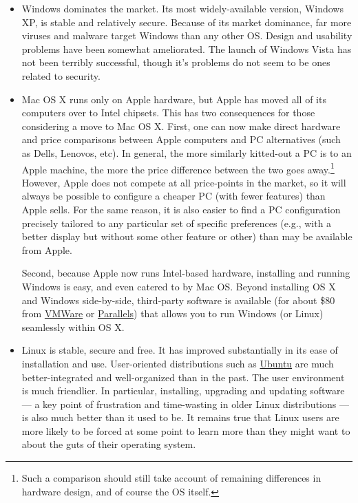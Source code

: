 \documentclass[11pt,article]{memoir}
\begin{document}
\begin{itemize}
	\item Windows dominates the market. Its most widely-available version, Windows XP, is stable and relatively secure. Because of its market dominance, far more viruses and malware target Windows than any other OS. Design and usability problems have been somewhat ameliorated. The launch of Windows Vista has not been terribly successful, though it's problems do not seem to be ones related to security.

	\item Mac OS X runs only on Apple hardware, but Apple has moved all of its computers over to Intel chipsets. This has two consequences for those considering a move to Mac OS X. First, one can now make direct hardware and price comparisons between Apple computers and PC alternatives (such as Dells, Lenovos, etc). In general, the more similarly kitted-out a PC is to an Apple machine, the more the price difference between the two goes away.\footnote{Such a comparison should still take account of remaining differences in hardware design, and of course the OS itself.} However, Apple does not compete at all price-points in the market, so it will always be possible to configure a cheaper PC (with fewer features) than Apple sells. For the same reason, it is also easier to find a PC configuration precisely tailored to any particular set of specific preferences (e.g., with a better display but without some other feature or other) than may be available from Apple. 
	
	Second, because Apple now runs Intel-based hardware, installing and running Windows is easy, and even catered to by Mac OS. Beyond installing OS X and Windows side-by-side, third-party software is available (for about \$80 from \href{http://www.vmware.com/products/fusion/}{VMWare} or \href{http://www.parallels.com/}{Parallels}) that allows you to run Windows (or Linux) seamlessly within OS X. 
	\item Linux is stable, secure and free. It has improved substantially in its ease of installation and use. User-oriented distributions such as \href{http://www.ubuntu.com/}{Ubuntu} are much better-integrated and well-organized than in the past. The user environment is much friendlier. In particular, installing, upgrading and updating software --- a key point of frustration and time-wasting in older Linux distributions --- is also much better than it used to be. It remains true that Linux users are more likely to be forced at some point to learn more than they might want to about the guts of their operating system.
	
\end{itemize}
\end{document}
